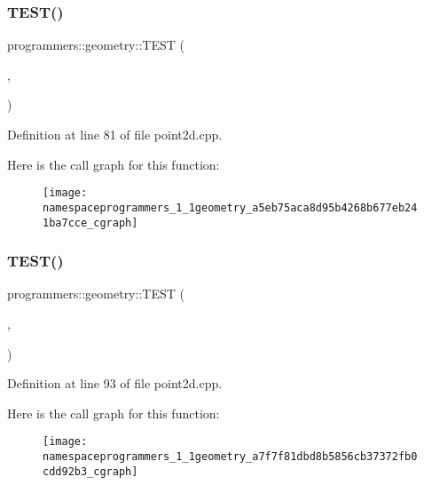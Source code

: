 \subsubsection{\texorpdfstring{T\+E\+S\+T()}{TEST()}\hspace{0.1cm}{\footnotesize\ttfamily [7/8]}}
{\footnotesize\ttfamily programmers\+::geometry\+::\+T\+E\+ST (\begin{DoxyParamCaption}\item[{Geometry\+Point2D}]{,  }\item[{SetX}]{ }\end{DoxyParamCaption})}



Definition at line 81 of file point2d.\+cpp.

Here is the call graph for this function\+:\nopagebreak
\begin{figure}[H]
\begin{center}
\leavevmode
\texttt{[image: namespaceprogrammers\_1\_1geometry\_a5eb75aca8d95b4268b677eb241ba7cce\_cgraph]}
\end{center}
\end{figure}
\mbox{\label{namespaceprogrammers_1_1geometry_a7f7f81dbd8b5856cb37372fb0cdd92b3}} 
\subsubsection{\texorpdfstring{T\+E\+S\+T()}{TEST()}\hspace{0.1cm}{\footnotesize\ttfamily [8/8]}}
{\footnotesize\ttfamily programmers\+::geometry\+::\+T\+E\+ST (\begin{DoxyParamCaption}\item[{Geometry\+Point2D}]{,  }\item[{SetY}]{ }\end{DoxyParamCaption})}



Definition at line 93 of file point2d.\+cpp.

Here is the call graph for this function\+:\nopagebreak
\begin{figure}[H]
\begin{center}
\leavevmode
\texttt{[image: namespaceprogrammers\_1\_1geometry\_a7f7f81dbd8b5856cb37372fb0cdd92b3\_cgraph]}
\end{center}
\end{figure}
